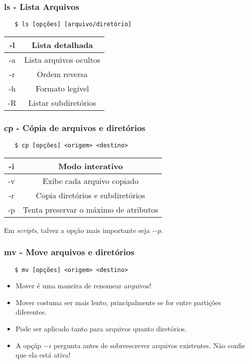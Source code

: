 \documentclass{beamer}
\begin{document}
\begin{frame}[fragile]
   \frametitle{ls - Lista Arquivos}
   \begin{verbatim}
   $ ls [opções] [arquivo/diretório] 
   \end{verbatim}
   \begin{table}
      \begin{tabular}{ c | c }
      -l & Lista detalhada \\
      \hline 
      -a & Lista arquivos ocultos \\
      \hline
      -r & Ordem reversa \\
      \hline
      -h & Formato legível \\
      \hline 
      -R & Listar subdiretórios \\
      \end{tabular}
   \end{table}
\end{frame}

\begin{frame}[fragile]
   \frametitle{cp - Cópia de arquivos e diretórios}
   \begin{verbatim}
   $ cp [opções] <origem> <destino>
   \end{verbatim}
   \begin{table}
      \begin{tabular}{ c | c }
      -i & Modo interativo \\
      \hline 
      -v & Exibe cada arquivo copiado \\
      \hline
      -r & Copia diretórios e subdiretórios \\
      \hline
      -p & Tenta preservar o máximo de atributos \\
      \end{tabular}
   \end{table}
   Em \textit{scripts}, talvez a opção mais importante seja $-p$.
\end{frame}

\begin{frame}[fragile]
   \frametitle{mv - Move arquivos e diretórios}
   \begin{verbatim}
   $ mv [opções] <origem> <destino> 
   \end{verbatim}
   \begin{itemize}
      \item Mover é uma maneira de renomear arquivos!
      \item Mover costuma ser mais lento, principalmente se for entre partições diferentes.
      \item Pode ser aplicado tanto para arquivos quanto diretórios.
      \item A opçãp $-i$ pergunta antes de sobreescrever arquivos existentes. Não confie que ela está ativa!
   \end{itemize}
\end{frame}
\end{document}
